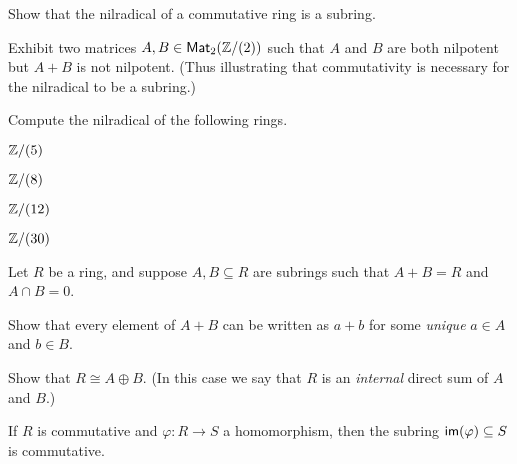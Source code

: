 \begin{exercise}
Show that the nilradical of a commutative ring is a subring.
\end{exercise}

\begin{exercise}
Exhibit two matrices \(A, B \in \mathsf{Mat}_{2}(\mathbb{Z}/(2))\) such that \(A\) and \(B\) are both nilpotent but \(A + B\) is not nilpotent. (Thus illustrating that commutativity is necessary for the nilradical to be a subring.)
\end{exercise}

\begin{exercise}
Compute the nilradical of the following rings.
\begin{proplist*}
\item \(\mathbb{Z}/(5)\)
\item \(\mathbb{Z}/(8)\)
\item \(\mathbb{Z}/(12)\)
\item \(\mathbb{Z}/(30)\)
\end{proplist*}
\end{exercise}

\begin{exercise}
Let \(R\) be a ring, and suppose \(A,B \subseteq R\) are subrings such that \(A + B = R\) and \(A \cap B = 0\).
\begin{proplist}
\item Show that every element of \(A + B\) can be written as \(a + b\) for some \emph{unique} \(a \in A\) and \(b \in B\).
\item Show that \(R \cong A \oplus B\). (In this case we say that \(R\) is an \emph{internal} direct sum of \(A\) and \(B\).)
\end{proplist}
\end{exercise}

\begin{exercise}
If \(R\) is commutative and \(\varphi : R \rightarrow S\) a homomorphism, then the subring \( \mathsf{im}(\varphi)  \subseteq S\) is commutative.
\end{exercise}

